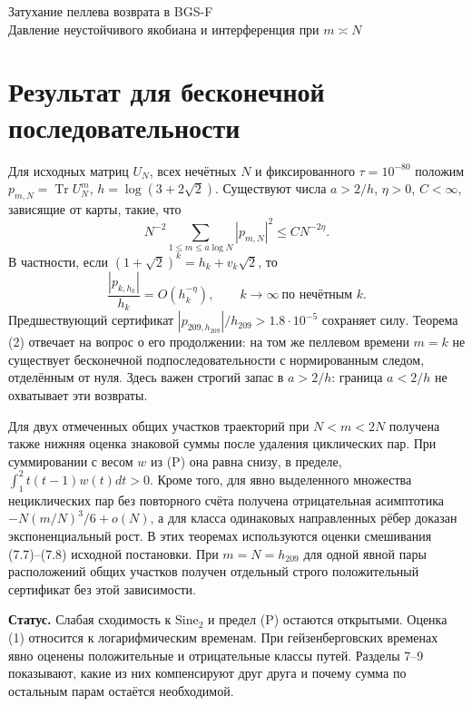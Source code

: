 \documentclass[11pt,a4paper]{article}
\newcommand{\Tr}{\operatorname{Tr}}
\newcommand{\si}{\mathrm{Sine}_2}
\newcommand{\sect}[1]{\section*{\sffamily\color{ink}#1}}
\newcommand{\subt}[1]{\par\medskip\noindent\textbf{#1.}\quad}
\begin{document}
\begin{center}{\LARGE\sffamily Затухание пеллева возврата в BGS-F}\\[4pt]
{\large Давление неустойчивого якобиана и интерференция при $m\asymp N$}
\end{center}
\sect{Результат для бесконечной последовательности}
Для исходных матриц $U_N$, всех нечётных $N$ и фиксированного $\tau=10^{-80}$ положим $p_{m,N}=\Tr U_N^m$, $h=\log(3+2\sqrt2)$. Существуют числа $a>2/h$, $\eta>0$, $C<\infty$, зависящие от карты, такие, что
\[
 \boxed{\quad N^{-2}\sum_{1\le m\le a\log N}|p_{m,N}|^2\le C N^{-2\eta}.\quad} \tag{1}
\]
В частности, если $(1+\sqrt2)^k=h_k+v_k\sqrt2$, то
\[
 \frac{|p_{k,h_k}|}{h_k}=O(h_k^{-\eta}),\qquad k\to\infty\ \text{по нечётным }k. \tag{2}
\]
Предшествующий сертификат $|p_{209,h_{209}}|/h_{209}>1.8\cdot10^{-5}$ сохраняет силу. Теорема (2) отвечает на вопрос о его продолжении: на том же пеллевом времени $m=k$ не существует бесконечной подпоследовательности с нормированным следом, отделённым от нуля. Здесь важен строгий запас в $a>2/h$: граница $a<2/h$ не охватывает эти возвраты.

Для двух отмеченных общих участков траекторий при $N<m<2N$ получена также нижняя оценка знаковой суммы после удаления циклических пар. При суммировании с весом $w$ из (P) она равна снизу, в пределе, $\int_1^2 t(t-1)w(t)dt>0$. Кроме того, для явно выделенного множества нециклических пар без повторного счёта получена отрицательная асимптотика $-N(m/N)^3/6+o(N)$, а для класса одинаковых направленных рёбер доказан экспоненциальный рост. В этих теоремах используются оценки смешивания (7.7)--(7.8) исходной постановки. При $m=N=h_{209}$ для одной явной пары расположений общих участков получен отдельный строго положительный сертификат без этой зависимости.

\subt{Статус} Слабая сходимость к $\si$ и предел (P) остаются открытыми. Оценка (1) относится к логарифмическим временам. При гейзенберговских временах явно оценены положительные и отрицательные классы путей. Разделы 7--9 показывают, какие из них компенсируют друг друга и почему сумма по остальным парам остаётся необходимой.
\end{document}
